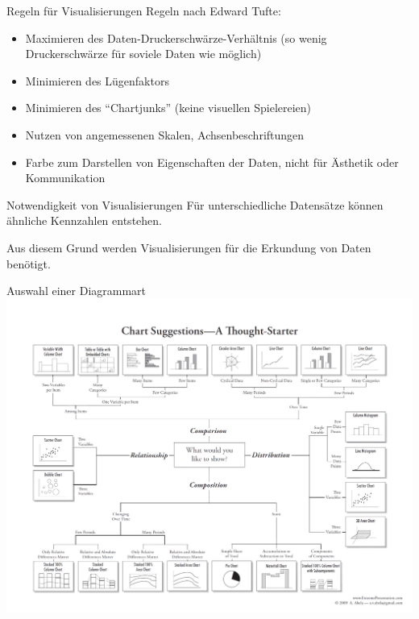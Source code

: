 \begin{defi}{Regeln für Visualisierungen}
    Regeln nach Edward Tufte:
    \begin{itemize}
        \item Maximieren des Daten-Druckerschwärze-Verhältnis (so wenig Druckerschwärze für soviele Daten wie möglich)
        \item Minimieren des Lügenfaktors
        \item Minimieren des \enquote{Chartjunks} (keine visuellen Spielereien)
        \item Nutzen von angemessenen Skalen, Achsenbeschriftungen
        \item Farbe zum Darstellen von Eigenschaften der Daten, nicht für Ästhetik oder Kommunikation
    \end{itemize}
\end{defi}

\begin{bonus}{Notwendigkeit von Visualisierungen}
    Für unterschiedliche Datensätze können ähnliche Kennzahlen entstehen.

    Aus diesem Grund werden Visualisierungen für die Erkundung von Daten benötigt.
\end{bonus}

\begin{bonus}{Auswahl einer Diagrammart}
    \includegraphics[width=\textwidth]{includes/figures/bonus_chart_suggestion.png}
\end{bonus}

